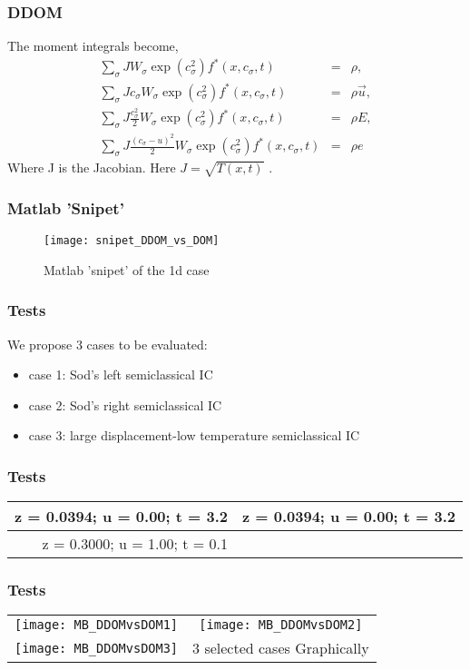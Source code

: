 \begin{frame}
	\frametitle{DDOM}
	The moment integrals become,
	\begin{eqnarray}
		\sum_\sigma J W_\sigma \exp(c_\sigma^2) f^*(x,c_\sigma,t) &=&  \rho, \\
		\sum_\sigma J c_\sigma W_\sigma \exp(c_\sigma^2) f^*(x,c_\sigma,t) &=& \rho \vec{u}, \nonumber \\
		\sum_\sigma J \frac{c_\sigma^2}{2} W_\sigma \exp(c_\sigma^2) f^*(x,c_\sigma,t) &=& \rho E, \nonumber \\
		\sum_\sigma J \frac{(c_\sigma-u)^2}{2} W_\sigma \exp(c_\sigma^2) f^*(x,c_\sigma,t) &=& \rho e  \nonumber
	\end{eqnarray}
	Where J is the Jacobian. Here $J = \sqrt{T(x,t)}$ .
\end{frame}

\begin{frame}
	\frametitle{Matlab 'Snipet'}
	\begin{figure}
	\centering
	\texttt{[image: snipet\_DDOM\_vs\_DOM]}%
	\caption{Matlab 'snipet' of the 1d case}
	\end{figure}	
\end{frame}

\begin{frame}
	\frametitle{Tests}
	We propose 3 cases to be evaluated:
	\begin{itemize}
	\item case 1: Sod's left semiclassical IC
	\item case 2: Sod's right semiclassical IC
	\item case 3: large displacement-low temperature semiclassical IC
	\end{itemize}
\end{frame}

\begin{frame}
	\frametitle{Tests}
	\centering
	\begin{tabular}{r | c}
	z = 0.0394; u = 0.00; t = 3.2 &  z = 0.0394; u = 0.00; t = 3.2 \\ \hline
	z = 0.3000; u = 1.00; t = 0.1 & \\
	\end{tabular}
\end{frame}

\begin{frame}
	\frametitle{Tests}
	\begin{tabular}{r c}
	\centering
	\texttt{[image: MB\_DDOMvsDOM1]} & \texttt{[image: MB\_DDOMvsDOM2]} \\ 
	\texttt{[image: MB\_DDOMvsDOM3]} & {3 selected cases Graphically}\\
	\end{tabular}
\end{frame}

